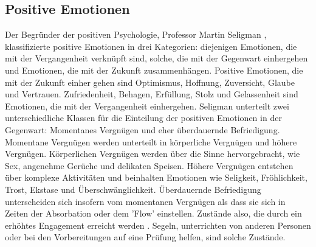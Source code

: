 \subsection{Positive Emotionen}\label{subsec.swbPosEmotion}
Der Begründer der positiven Psychologie, Professor Martin Seligman \citeyear{Seligman:2002}, klassifizierte positive Emotionen in drei Kategorien: diejenigen Emotionen, die mit der Vergangenheit verknüpft sind, solche, die mit der Gegenwart einhergehen und Emotionen, die mit der Zukunft zusammenhängen. Positive Emotionen, die mit der Zukunft einher gehen sind Optimismus, Hoffnung, Zuversicht, Glaube und Vertrauen. Zufriedenheit, Behagen, Erfüllung, Stolz und Gelassenheit sind Emotionen, die mit der Vergangenheit einhergehen. Seligman unterteilt zwei unterschiedliche Klassen für die Einteilung der positiven Emotionen in der Gegenwart: Momentanes Vergnügen und eher überdauernde Befriedigung. Momentane Vergnügen werden unterteilt in körperliche Vergnügen und höhere Vergnügen. Körperlichen Vergnügen werden über die Sinne hervorgebracht, wie Sex, angenehme Gerüche und delikaten Speisen.  Höhere Vergnügen entstehen über komplexe Aktivitäten und beinhalten Emotionen wie Seligkeit, Fröhlichkeit, Trost, Ekstase und Überschwänglichkeit. Überdauernde Befriedigung unterscheiden sich insofern vom momentanen Vergnügen als dass sie sich in Zeiten der Absorbation oder dem 'Flow' einstellen. Zustände also, die durch ein erhöhtes Engagement erreicht werden \cite{Carr:2011}. Segeln, unterrichten von anderen Personen oder bei den Vorbereitungen auf eine Prüfung helfen, sind solche Zustände. 

